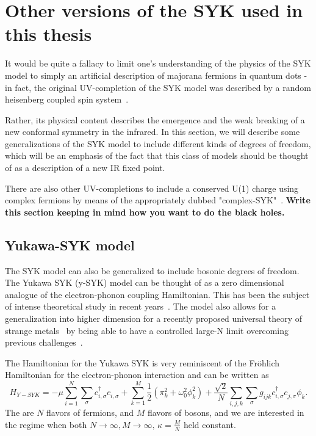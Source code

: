 \section{Other versions of the SYK used in this thesis}
It would be quite a fallacy to limit one's understanding of the physics of the SYK model to simply an artificial description of majorana fermions in quantum dots - in fact, the original UV-completion of the SYK model was described by a random heisenberg coupled spin system~\cite{sachdev1993gapless}.
\par
Rather, its physical content  describes the emergence and the weak breaking of a new conformal symmetry in the infrared. In this section, we will describe some generalizations of the SYK model to include different kinds of degrees of freedom, which will be an emphasis of the fact that this class of models should be thought of as a description of a new IR fixed point. 

There are also other UV-completions to include a conserved U(1) charge using complex fermions by means of the appropriately dubbed "complex-SYK"~\cite{sachdev2015bekenstein}. 
\textbf{Write this section keeping in mind how you want to do the black holes.}\cite{gu_notes_2020}


\subsection{Yukawa-SYK model}
The SYK model can also be generalized to include bosonic degrees of freedom. The Yukawa SYK (y-SYK) model can be thought of as a zero dimensional analogue of the electron-phonon coupling Hamiltonian. This has been the subject of intense theoretical study in recent years~\cite{esterlis2019cooper,wang2020quantum,wang2020solvable,classen2021superconductivity,inkof2022quantum,pan2021yukawa,davis2023quantum,grunwald2024dynamical,choi2022pairing}. The model also allows for a generalization into higher dimension for a recently proposed universal theory of strange metals~\cite{patel2023universal,valentinis2023correlation,esterlis2021large,guo2022large,guo2023large,li2024strange} by being able to have a controlled large-N limit overcoming previous challenges~\cite{lee2009low}.

\par
The Hamiltonian for the Yukawa SYK is very reminiscent of the Fr\"ohlich Hamiltonian for the electron-phonon interaction and can be written as 
\begin{equation}
    H_{Y-SYK} = -\mu\sum_{i=1}^N\sum_\sigma c^\dagger_{i,\sigma} c^{\phantom{\dagger}}_{i, \sigma} + \sum_{k=1}^M \frac{1}{2}\left(\pi_k^2 + \omega_0^2\phi_k^2\right) + \frac{\sqrt{2}}{N}\sum_{i,j,k}\sum_{\sigma}g_{ijk} c^\dagger_{i,\sigma} c^{\phantom{\dagger}}_{j,\sigma} \phi^{\phantom{\dagger}}_k .
    \label{eq:HYSYK}
\end{equation}
The are $N$ flavors of fermions, and $M$ flavors of bosons, and we are interested in the regime when both $N\rightarrow\infty, M\rightarrow\infty, \, \kappa = \frac{M}{N}$ held constant. 

